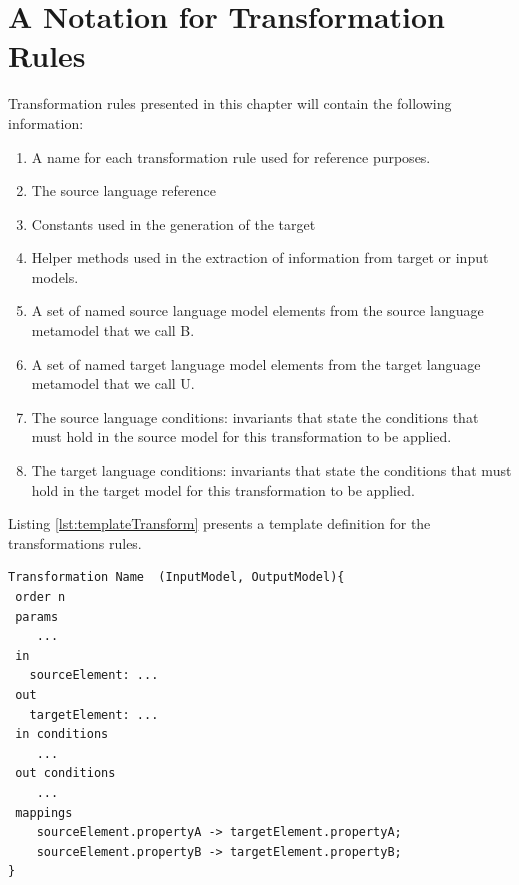 \section{A Notation for Transformation Rules}
\label{sec:2ModelTransformation}

Transformation rules presented in this chapter will contain the following information:

\begin{enumerate}

\item A name for each transformation rule used for reference purposes.

\item The source language reference

\item Constants used in the generation of the target

\item Helper methods used in the extraction of information from target or input models.

\item A set of named source language model elements from the source language metamodel that we call B.

\item A set of named target language model elements from the target language metamodel that we call U.

\item The source language conditions: invariants that state the conditions that must hold in the source model for this transformation to be applied.

\item The target language conditions: invariants that state the conditions that must hold in the target model for this transformation to be applied.

\end{enumerate}


Listing \ref{lst:templateTransform} presents a template definition for the transformations rules.

\begin{lstlisting}[style=mine,caption=Template definition for Transformation rules,label=lst:templateTransform]
Transformation Name  (InputModel, OutputModel){
 order n
 params
 	...
 in
   sourceElement: ...
 out
   targetElement: ...
 in conditions
    ...
 out conditions
 	...
 mappings
    sourceElement.propertyA -> targetElement.propertyA;
    sourceElement.propertyB -> targetElement.propertyB;
}
\end{lstlisting}

